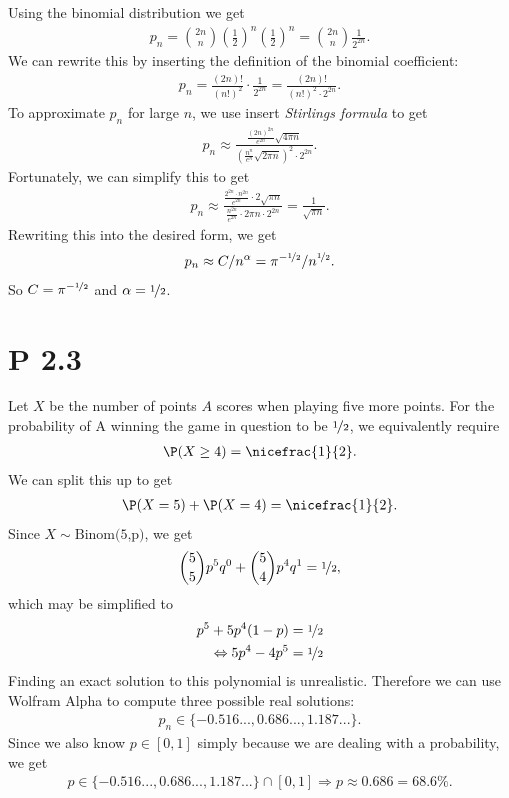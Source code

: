 \documentclass{article}
\begin{document}
Using the binomial distribution we get
\begin{align*}
  p_n = \binom{2n}{n}\left(\frac{1}{2}\right)^n\left(\frac{1}{2}\right)^n
  =\binom{2n}{n}\frac{1}{2^{2n}}.
\end{align*}
We can rewrite this by inserting the definition of the binomial
coefficient:
\begin{align*}
  p_n = \frac{(2n)!}{(n!)^2}\cdot\frac{1}{2^{2n}}=\frac{(2n)!}{(n!)^2\cdot 2^{2n}}.
\end{align*}
To approximate $p_n$ for large $n$, we use insert \emph{Stirlings formula}
to get
\begin{align*}
  p_n \approx \frac{
    \frac{(2n)^{2n}}{e^{2n}}\sqrt{4\pi n}
  }{
    \left(\frac{n^n}{e^n}\sqrt{2\pi n}\right)^2\cdot 2^{2n}}.
\end{align*}
Fortunately, we can simplify this to get
\begin{align*}
  p_n\approx \frac{
    \frac{2^{2n}\cdot n^{2n}}{e^{2n}}\cdot2\sqrt{\pi n}
  }{
    \frac{n^{2n}}{e^{2n}}\cdot 2\pi n\cdot 2^{2n}}=\frac{1}{\sqrt{\pi n}}.
\end{align*}
Rewriting this into the desired form, we get
\begin{align*}
  p_n\approx C / n^\alpha = \pi^{-\nicefrac{1}{2}}/n^{\nicefrac{1}{2}}.
\end{align*}
So $C=\pi^{-\nicefrac{1}{2}}$ and $\alpha=\nicefrac{1}{2}$.
\section*{P 2.3}
Let $X$ be the number of points $A$ scores when playing five more points.
For the probability of A winning the game in question
to be $\nicefrac{1}{2}$, we equivalently require
\begin{align*}
  \P(X\geq 4) = \nicefrac{1}{2}.
\end{align*}
We can split this up to get
\begin{align*}
  \P(X = 5) + \P(X = 4) = \nicefrac{1}{2}.
\end{align*}
Since $X\sim\text{Binom(5,p)}$, we get
\begin{align*}
  \binom{5}{5}p^5q^0+\binom{5}{4}p^4q^1=\nicefrac{1}{2},
\end{align*}
which may be simplified to
\begin{align*}
  p^5+5p^4(1-p)             & = \nicefrac{1}{2} \\
  \Leftrightarrow 5p^4-4p^5 & =\nicefrac{1}{2}
\end{align*}
Finding an exact solution to this polynomial is unrealistic.
Therefore we can use Wolfram Alpha to compute three possible real solutions:
\begin{align*}
  p_n \in \{-0.516..., 0.686..., 1.187...\}.
\end{align*}
Since we also know $p\in[0,1]$ simply because we are dealing with a
probability, we get
\begin{align*}
  p\in \{-0.516..., 0.686..., 1.187...\} \cap [0,1] \Rightarrow p \approx 0.686=68.6\%.
\end{align*}
\end{document}
